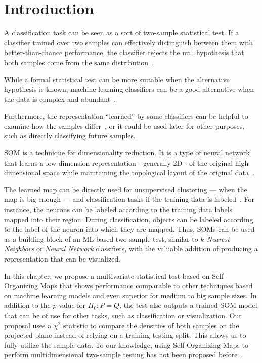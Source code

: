 
\section{Introduction}

A classification task can be seen as a sort of two-sample statistical test.
If a classifier trained over two samples can effectively distinguish between
them with better-than-chance performance, the classifier rejects the null
hypothesis that both samples come from the same distribution~\cite{friedman2004multivariate}.

While a formal statistical test can be more suitable when the alternative
hypothesis is known, machine learning classifiers can be a good alternative
when the data is complex and abundant~\cite{kirchler2020two,kim2021classification,pmlr-v119-liu20m}.

Furthermore, the representation ``learned'' by some classifiers can be helpful
to examine how the samples differ~\cite{friedman2004multivariate,lopez2016revisiting},
or it could be used later for other purposes, such as directly classifying future samples.

\medskip

\gls{SOM} is a technique for dimensionality
reduction. It is a type of neural network that learns a low-dimension representation
- generally 2D - of the original high-dimensional space while maintaining the topological
layout of the original data~\cite{kohonen1982self, Villmann1999}.

The learned map can be directly used for unsupervised clustering --- when the map is big enough ---
and classification tasks if the training data is labeled~\cite{ultsch2005esom,ultsch2007emergence}.
For instance, the neurons can be labeled according to the training data labels mapped into their
region. During classification, objects can be labeled according to the label of the neuron
into which they are mapped.
Thus, \glspl{SOM} can be used as a building block of an ML-based two-sample test, similar to
\emph{$k$-Nearest Neighbors} or \emph{Neural Network} classifiers, with the valuable addition
of producing a representation that can be visualized.

In this chapter, we propose a multivariate statistical test based on
Self-Organizing Maps that shows performance comparable to other techniques based on 
machine learning models and even superior for medium to big sample sizes. In addition to the 
$p$ value for $H_0: P = Q$, the test also outputs a trained \gls{SOM} model that can be of
use for other tasks, such as classification or visualization.
Our proposal uses a $\chi^2$ statistic to compare the densities of both samples on
the projected plane instead of relying on a training-testing split. This allows us to fully
utilize the sample data. To our knowledge, using Self-Organizing Maps
to perform multidimensional two-sample testing has not been proposed
before~\cite{kaski1998bibliography,oja_bibliography_2003,polla_bibliography_2006}.

